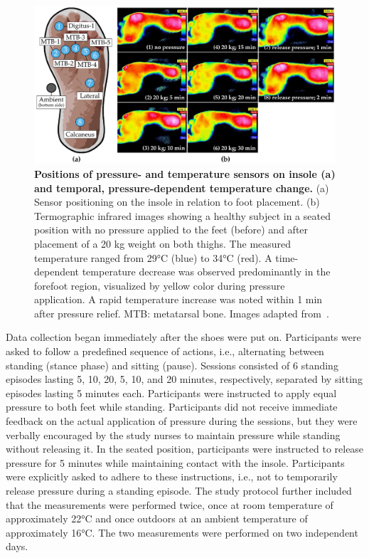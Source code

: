 \documentclass[
  oneside]{book}
\begin{document}
\begin{figure}[htbp]
\includegraphics[width=1\linewidth]{figures/02-df-infrared-sole-sensor-positions} \caption[fig.scap]{\textbf{Positions of pressure- and temperature sensors on insole (a) and temporal, pressure-dependent temperature change.} (a) Sensor positioning on the insole in relation to foot placement. (b) Termographic infrared images showing a healthy subject in a seated position with no pressure applied to the feet (before) and after placement of a 20 kg weight on both thighs. The measured temperature ranged from 29°C (blue) to 34°C (red). A time-dependent temperature decrease was observed predominantly in the forefoot region, visualized by yellow color during pressure application. A rapid temperature increase was noted within 1 min after pressure relief. MTB: metatarsal bone. Images adapted from~\autocite{Niemann:EBioMedicine2020}.}\label{fig:02-df-infrared-sole-sensor-positions-plot}
\end{figure}

Data collection began immediately after the shoes were put on.
Participants were asked to follow a predefined sequence of actions, i.e., alternating between standing (stance phase) and sitting (pause).
Sessions consisted of 6 standing episodes lasting 5, 10, 20, 5, 10, and 20 minutes, respectively, separated by sitting episodes lasting 5 minutes each.
Participants were instructed to apply equal pressure to both feet while standing.
Participants did not receive immediate feedback on the actual application of pressure during the sessions, but they were verbally encouraged by the study nurses to maintain pressure while standing without releasing it.
In the seated position, participants were instructed to release pressure for 5 minutes while maintaining contact with the insole.
Participants were explicitly asked to adhere to these instructions, i.e., not to temporarily release pressure during a standing episode.
The study protocol further included that the measurements were performed twice, once at room temperature of approximately 22°C and once outdoors at an ambient temperature of approximately 16°C.
The two measurements were performed on two independent days.
\end{document}
